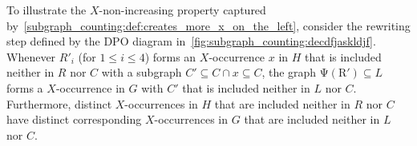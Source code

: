 \begin{example}
    To illustrate the $X$-non-increasing property captured by~\autoref{subgraph_counting:def:creates_more_x_on_the_left},
    consider the rewriting step defined by the DPO diagram in~\autoref{fig:subgraph_counting:decdfjaskldjf}. Whenever \( R'_i \) (for \( 1 \leq i \leq 4 \)) forms an \( X \)-occurrence $x$ in $H$ that is included neither in \( R \) nor $C$ with a subgraph $C' \subseteq C \cap x \subseteq C$, the graph
    \( \operatorname{\Psi(R')} \subseteq L\) forms a \( X \)-occurrence in $G$ with $C'$ that is included neither in \( L \) nor $C$.
    Furthermore, distinct $X$-occurrences in $H$ that are included neither in \( R \) nor $C$ have distinct corresponding $X$-occurrences in $G$ that are included neither in \( L \) nor $C$.
    \begin{figure}[!htbp]
        \centering 
\end{figure}
\end{example}
